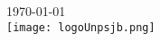 \begin{titlepage}


    {\large \today}\\[1cm] %



    \texttt{[image: logoUnpsjb.png]}\\[0.5cm] %

     

     \vfill %

\end{titlepage}
